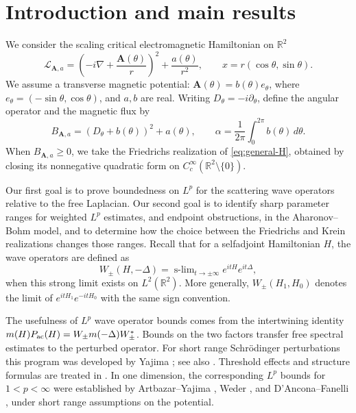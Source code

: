 \documentclass[11pt,a4paper,reqno,backref=page]{amsart}
\newcommand{\R}{\mathbb R}
\DeclareMathOperator*{\slim}{s\text{-}lim}
\numberwithin{equation}{section}
\theoremstyle{definition}
\theoremstyle{remark}
\begin{document}
\maketitle


\section{Introduction and main results}\label{sec:intro}


We consider the scaling critical electromagnetic Hamiltonian
on $\R^2$
\begin{equation}\label{eq:general-H}
  \mathcal L_{\mathbf A,a}
  =\left(-i\nabla+\frac{\mathbf A(\theta)}r\right)^2
  +\frac{a(\theta)}{r^2},\qquad
  x=r(\cos\theta,\sin\theta).
\end{equation}
We assume a transverse magnetic potential:
$\mathbf A(\theta)=b(\theta)e_\theta$, where
$e_\theta=(-\sin\theta,\cos\theta)$, and $a,b$ are real.
Writing $D_\theta=-i\partial_\theta$, define the angular
operator and the magnetic flux by
\begin{equation}\label{eq:general-angular}
  B_{\mathbf A,a}=(D_\theta+b(\theta))^2+a(\theta),
  \qquad
  \alpha=\frac1{2\pi}\int_0^{2\pi}b(\theta)\,d\theta.
\end{equation}
When $B_{\mathbf A,a}\ge0$, we take the Friedrichs
realization of \eqref{eq:general-H}, obtained by closing its
nonnegative quadratic form on
$C_c^\infty(\R^2\setminus\{0\})$.

Our first goal is to prove boundedness on $L^p$ for the
scattering wave operators relative to the free
Laplacian. Our second goal is to identify sharp parameter
ranges for weighted $L^{p}$ estimates,
and endpoint obstructions, in the Aharonov--Bohm model,
and to determine how the choice between the Friedrichs and
Krein realizations changes those ranges.
Recall that for a selfadjoint Hamiltonian $H$, 
the wave operators are defined as
\begin{equation}\label{eq:general-wave}
  W_\pm(H,-\Delta)
  =\slim_{t\to\pm\infty}e^{itH}e^{it\Delta},
\end{equation}
when this strong limit exists on $L^2(\R^2)$. More generally,
$W_\pm(H_1,H_0)$ denotes the limit of
$e^{itH_1}e^{-itH_0}$ with the same sign convention.

The usefulness of $L^p$ wave operator bounds comes from the
intertwining identity
$m(H)P_{\rm ac}(H)=W_\pm m(-\Delta)W_\pm^*$.
Bounds on the two factors transfer free spectral estimates
to the perturbed operator. For short range Schr\"odinger
perturbations this program was developed by Yajima
\cite{Yajima1995,Yajima1999}; see also
\cite{JensenYajima2002}. Threshold effects and
structure formulas are treated in
\cite{Yajima2006,FincoYajima2006,Beceanu2014,
  BeceanuSchlag2020,DMSY2018,CMY2019}.
In one dimension, the corresponding $L^p$ bounds for
$1<p<\infty$ were established by 
Artbazar--Yajima \cite{ArtbazarYajima2000}, 
Weder \cite{Weder1999},
and
D'Ancona--Fanelli \cite{DAnconaFanelli2006}, under short
range assumptions on the potential.
\end{document}
